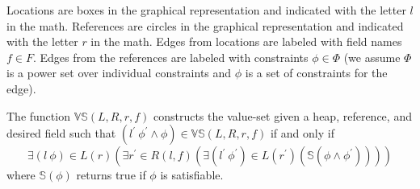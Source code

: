Locations are boxes in the graphical representation and indicated with
the letter $l$ in the math. References are circles in the graphical
representation and indicated with the letter $r$ in the math. Edges
from locations are labeled with field names $f \in F$. Edges from the
references are labeled with constraints $\phi \in \Phi$ (we assume
$\Phi$ is a power set over individual constraints and $\phi$ is a set
of constraints for the edge).

The function $\mathbb{VS}(L,R,r,f)$ constructs the value-set given a
heap, reference, and desired field such that
$(l^\prime\ \phi^\prime\wedge\phi) \in \mathbb{VS}(L,R,r,f)$ if and
only if
\[
  \exists (l\ \phi) \in L(r) \left ( 
     \exists r^\prime \in R(l,f) \left ( 
        \exists (l^\prime\ \phi^\prime) \in L(r^\prime) \left ( 
           \mathbb{S}(\phi\wedge\phi^\prime) 
        \right ) 
     \right )
  \right )
\]
where $\mathbb{S}(\phi)$ returns true if $\phi$ is satisfiable.



\begin{comment}
\begin{algorithm}
 \SetAlgoLined
 \KwData{this text}
 \KwResult{how to write algorithm with \LaTeX2e }
 initialization\;
 \While{not at end of this document $\wedge x < 2$}{
  read current\;
  \eIf{understand}{
   go to next section\;
   current section becomes this one\;
   }{
   go back to the beginning of current section\;
  }
 }
 \caption{How to write algorithms}
\end{algorithm}
\end{comment}
